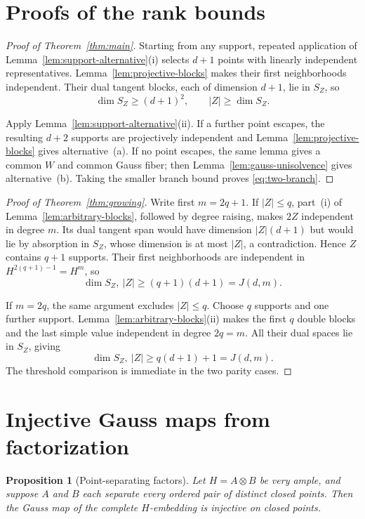 \documentclass[11pt]{article}
\newtheorem{proposition}[theorem]{Proposition}
\begin{document}
\section{Proofs of the rank bounds}

\begin{proof}[Proof of Theorem~\ref{thm:main}]
Starting from any support, repeated application of
Lemma~\ref{lem:support-alternative}(i) selects $d+1$ points with linearly
independent representatives.  Lemma~\ref{lem:projective-blocks} makes their
first neighborhoods independent.  Their dual tangent blocks, each of
dimension $d+1$, lie in $S_Z$, so
\[
 \dim S_Z\geq(d+1)^2,
 \qquad |Z|\geq\dim S_Z.
\]

Apply Lemma~\ref{lem:support-alternative}(ii).  If a further point escapes,
the resulting $d+2$ supports are projectively independent and
Lemma~\ref{lem:projective-blocks} gives alternative~(a).  If no point escapes,
the same lemma gives a common $W$ and common Gauss fiber; then
Lemma~\ref{lem:gauss-unisolvence} gives alternative~(b).  Taking the smaller
branch bound proves \eqref{eq:two-branch}.
\end{proof}

\begin{proof}[Proof of Theorem~\ref{thm:growing}]
Write first $m=2q+1$.  If $|Z|\leq q$, part~(i) of
Lemma~\ref{lem:arbitrary-blocks}, followed by degree raising, makes $2Z$
independent in degree $m$.  Its dual tangent span would have dimension
$|Z|(d+1)$ but would lie by absorption in $S_Z$, whose dimension is at most
$|Z|$, a contradiction.  Hence $Z$ contains $q+1$ supports.  Their first
neighborhoods are independent in $H^{2(q+1)-1}=H^m$, so
\[
 \dim S_Z,\ |Z|\geq(q+1)(d+1)=J(d,m).
\]

If $m=2q$, the same argument excludes $|Z|\leq q$.  Choose $q$ supports and
one further support.  Lemma~\ref{lem:arbitrary-blocks}(ii) makes the first
$q$ double blocks and the last simple value independent in degree $2q=m$.
All their dual spaces lie in $S_Z$, giving
\[
 \dim S_Z,\ |Z|\geq q(d+1)+1=J(d,m).
\]
The threshold comparison is immediate in the two parity cases.
\end{proof}

\section{Injective Gauss maps from factorization}

\begin{proposition}[Point-separating factors]\label{prop:factorized-gauss}
Let $H=A\otimes B$ be very ample, and suppose $A$ and $B$ each separate every
ordered pair of distinct closed points.  Then the Gauss map of the complete
$H$-embedding is injective on closed points.
\end{proposition}
\end{document}
